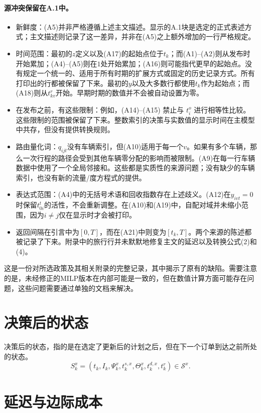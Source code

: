 \documentclass{article}
\begin{document}
\paragraph{源冲突保留在A.1中。}
\begin{itemize}
\item 新鲜度：(A5)并非严格遵循上述主文描述。显示的A.1块是选定的正式表述方式；主文描述则记录了这一差异，并非在(A5)之上额外增加的一行严格规定。
\item 时间范围：最初的\(z\)定义以及(A17)的起始点位于\(t_k\)；而(A1)--(A2)则从发布时开始累加；(A4)--(A5)则在\(1\)处开始累加；(A16)则可能指代更早的起始点。没有规定一个统一的、适用于所有时期的扩展方式或固定的历史记录方式。所有打印出的行都被保留了下来。最初的\(y\)以及大多数行都使用\(t_k\)作为起始点；而(A18)则从\(t_{kv}^r\)开始。早期时期的数值并不会被自动设置为零。
\item 在发布之前，有这些限制：例如，(A14)--(A15) 禁止与 \(t_i^o\) 进行相等性比较。这些限制的范围被保留了下来。整数索引的决策与实数值的显示时间在主模型中共存，但没有提供转换规则。
\item 路由量化词：\(q_{ijt}\)没有车辆索引，但(A10)适用于每一个\(v\)。如果有多个车辆，那么一次行程的路径会受到其他车辆零分配的影响而被限制。(A9)在每一行车辆数据中使用了一个全局邻接和。这些都是实质性的来源问题；没有缺少的车辆索引，也没有新的流量/度方程式的提供。
\item 表达式范围：(A4)中的无括号术语和回收指数存在上述歧义。(A12)在\(y_{ivt}=0\)时保留\(t_{0i}^t\)的活性，不会重新调整。在(A10)和(A19)中，自配对域并未缩小范围，因为\(i\ne j\)仅在显示时才会被打印。
\item 返回间隔在引言中为\([0,T]\)，而在(A21)中则变为\([t_k,T]\)。两个来源的陈述都被记录了下来。附录中的旅行行并未默默地修复主文的延迟以及转换公式(2)和(4)。
\end{itemize}
这是一份对所选政策及其相关附录的完整记录，其中揭示了原有的缺陷。需要注意的是，未经修正的MILP版本在内部可能是一致的，但在数值计算方面可能存在问题，这些问题需要通过单独的文档来解决。

\section*{决策后的状态}

决策后的状态，指的是在选定了更新后的计划之后，但在下一个订单到达之前所处的状态。
\[
S^x_k=(t_k,I_k,\Psi^x_k,t^{s,x}_k,\Theta^x_k,t^{d,x}_k,t^r_k)
\in\mathcal{S}^x.
\]

\section*{延迟与边际成本}
\end{document}
